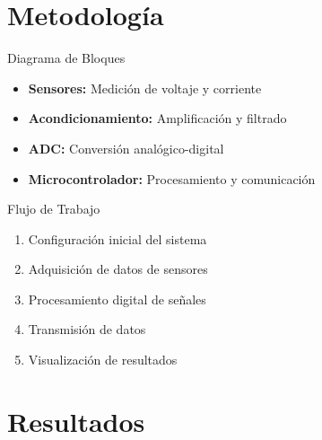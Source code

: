 \documentclass[11pt, spanish, aspectratio=169]{beamer}
\begin{document}
\section{Metodología}

\begin{frame}{Diagrama de Bloques}
    \begin{center}
    \end{center}
    \begin{itemize}
        \item \textbf{Sensores:} Medición de voltaje y corriente
        \item \textbf{Acondicionamiento:} Amplificación y filtrado
        \item \textbf{ADC:} Conversión analógico-digital
        \item \textbf{Microcontrolador:} Procesamiento y comunicación
    \end{itemize}
\end{frame}

\begin{frame}{Flujo de Trabajo}
    \begin{center}
    \end{center}
    \begin{enumerate}
        \item Configuración inicial del sistema
        \item Adquisición de datos de sensores
        \item Procesamiento digital de señales
        \item Transmisión de datos
        \item Visualización de resultados
    \end{enumerate}
\end{frame}

\section{Resultados}
\end{document}
